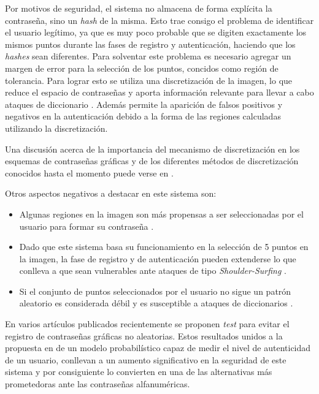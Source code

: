 Por motivos de seguridad, el sistema  no  almacena  de  forma explícita la contraseña,  sino  un \textit{hash} de la  misma.  Esto  trae  consigo  el  problema de identificar el usuario legítimo, ya que es muy poco probable que se digiten exactamente los mismos puntos durante las fases de registro y autenticación, haciendo que los \textit{hashes} sean diferentes. 
Para solventar este problema es necesario agregar un margen de error para la selección de los puntos, concidos como región de tolerancia. Para lograr esto se utiliza una discretización de la imagen, lo que reduce el espacio de contraseñas y aporta información relevante para  llevar  a  cabo  ataques  de  diccionario \cite{zhu2013security}. Además  permite  la  aparición  de  falsos  positivos  y negativos  en  la autenticación  debido  a  la  forma  de  las  regiones  calculadas  utilizando  la  discretización. 

 Una  discusión  acerca  de  la importancia del mecanismo de discretización en los esquemas de contraseñas gráficas y de los diferentes métodos de discretización conocidos hasta el momento puede verse en \cite{birget2006graphical, chiasson2008centered, bicakci2008optimal, kirovski2007click}. 

Otros aspectos negativos a destacar en este sistema son: 

\begin{itemize}
	\item Algunas regiones en la imagen son más propensas a ser seleccionadas por el usuario para formar su contraseña \cite{mypasswordhere}.
	
	\item Dado que este sistema basa su funcionamiento en la selección de 5 puntos en la imagen, la fase de registro y de autenticación pueden extenderse lo que conlleva a que sean vulnerables ante ataques de tipo \textit{Shoulder-Surfing} \cite{rodriguez2019algoritmo}.
	
	\item Si el conjunto de puntos seleccionados por el usuario no sigue un patrón aleatorio es considerada débil y es susceptible a ataques de diccionarios \cite{rodriguez2019algoritmo}.
\end{itemize}

En varios artículos publicados recientemente \cite{sym13050777, lissetMaster, s22051987, herrera2023comparacion, herrera2023nuevo, herrera2023nuevoregulares, herrera2024new} se proponen \textit{test} para evitar el registro de contraseñas gráficas no aleatorias. Estos resultados unidos a la propuesta en \cite{legon2019nuevo} de un modelo probabilístico capaz de medir el nivel de autenticidad de un usuario, conllevan a un aumento significativo en la seguridad de este sistema y por consiguiente lo convierten en una de las alternativas más prometedoras ante las contraseñas alfanuméricas.

